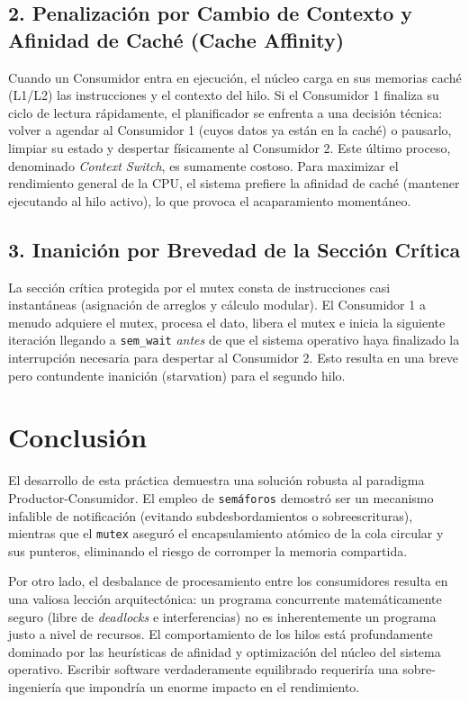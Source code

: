 \documentclass[runningheads]{llncs}
\begin{document}
\subsection{2. Penalización por Cambio de Contexto y Afinidad de Caché (Cache Affinity)}
Cuando un Consumidor entra en ejecución, el núcleo carga en sus memorias caché (L1/L2) las instrucciones y el contexto del hilo. Si el Consumidor 1 finaliza su ciclo de lectura rápidamente, el planificador se enfrenta a una decisión técnica: volver a agendar al Consumidor 1 (cuyos datos ya están en la caché) o pausarlo, limpiar su estado y despertar físicamente al Consumidor 2. Este último proceso, denominado \textit{Context Switch}, es sumamente costoso. Para maximizar el rendimiento general de la CPU, el sistema prefiere la afinidad de caché (mantener ejecutando al hilo activo), lo que provoca el acaparamiento momentáneo.

\subsection{3. Inanición por Brevedad de la Sección Crítica}
La sección crítica protegida por el mutex consta de instrucciones casi instantáneas (asignación de arreglos y cálculo modular). El Consumidor 1 a menudo adquiere el mutex, procesa el dato, libera el mutex e inicia la siguiente iteración llegando a \texttt{sem\_wait} \textit{antes} de que el sistema operativo haya finalizado la interrupción necesaria para despertar al Consumidor 2. Esto resulta en una breve pero contundente inanición (starvation) para el segundo hilo.

\section{Conclusión}
El desarrollo de esta práctica demuestra una solución robusta al paradigma Productor-Consumidor. El empleo de \texttt{semáforos} demostró ser un mecanismo infalible de notificación (evitando subdesbordamientos o sobreescrituras), mientras que el \texttt{mutex} aseguró el encapsulamiento atómico de la cola circular y sus punteros, eliminando el riesgo de corromper la memoria compartida.

Por otro lado, el desbalance de procesamiento entre los consumidores resulta en una valiosa lección arquitectónica: un programa concurrente matemáticamente seguro (libre de \textit{deadlocks} e interferencias) no es inherentemente un programa justo a nivel de recursos. El comportamiento de los hilos está profundamente dominado por las heurísticas de afinidad y optimización del núcleo del sistema operativo. Escribir software verdaderamente equilibrado requeriría una sobre-ingeniería que impondría un enorme impacto en el rendimiento. 
\end{document}
